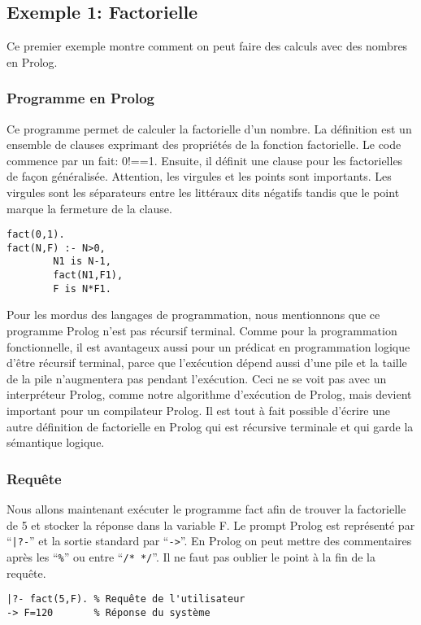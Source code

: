 \subsection{Exemple 1: Factorielle}

Ce premier exemple montre comment on peut faire des calculs avec des nombres en Prolog.

\subsubsection{Programme en Prolog}

Ce programme permet de calculer la factorielle d'un nombre.
La définition est un ensemble de clauses exprimant des propriétés de la fonction factorielle.
Le code commence par un fait: 0!==1.
Ensuite, il définit une clause pour les factorielles de façon généralisée.
Attention, les virgules et les points sont importants.
Les virgules sont les séparateurs entre les littéraux dits négatifs tandis que le point marque la fermeture de la clause.
\begin{verbatim}
fact(0,1).
fact(N,F) :- N>0, 
        N1 is N-1,
        fact(N1,F1), 
        F is N*F1.
\end{verbatim}
Pour les mordus des langages de programmation, nous mentionnons que ce programme Prolog n'est pas
récursif terminal.  Comme pour la programmation fonctionnelle, il est avantageux aussi pour un prédicat
en programmation logique
d'être récursif terminal, parce que l'exécution dépend aussi d'une pile
et la taille de la pile n'augmentera pas pendant l'exécution.
Ceci ne se voit pas avec un interpréteur Prolog, comme notre algorithme d'exécution de Prolog, mais devient important pour
un compilateur Prolog.
Il est tout à fait possible d'écrire une autre définition de factorielle en Prolog qui est récursive terminale
et qui garde la sémantique logique.

\subsubsection{Requête}

Nous allons maintenant exécuter le programme fact afin de trouver la factorielle de 5 et stocker la réponse dans la variable F.
Le prompt Prolog est représenté par ``\verb+|?-+'' et la sortie standard par ``\verb+->+''.
En Prolog on peut mettre des commentaires après les ``\verb+%+'' ou entre ``\verb+/* */+''.
Il ne faut pas oublier le point à la fin de la requête.
\begin{verbatim} 
|?- fact(5,F). % Requête de l'utilisateur
-> F=120       % Réponse du système
\end{verbatim}

